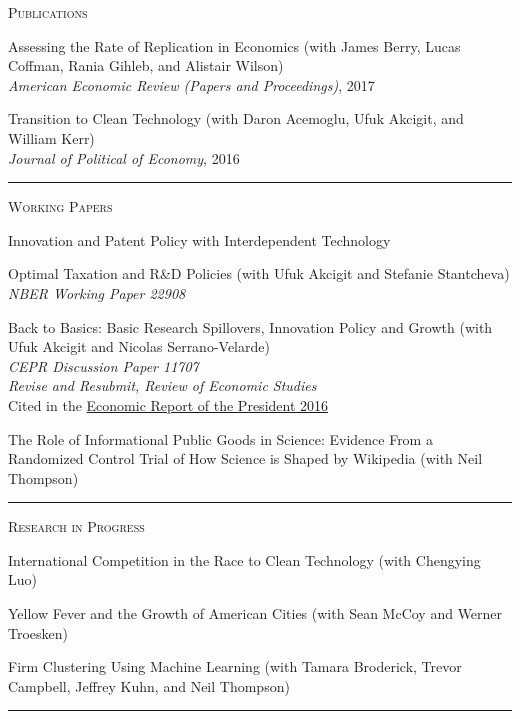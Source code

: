 \documentclass{article}
\begin{document}
\parbox{\textwidth}{
\parbox[t]{0.28\textwidth}{ \raggedright \noindent \textsc{ Publications } }
\parbox[t]{0.72\textwidth}{ \raggedright

Assessing the Rate of Replication in Economics (with James Berry, Lucas Coffman, Rania Gihleb, and Alistair Wilson) \\
\textit{American Economic Review (Papers and Proceedings)}, 2017
\vspace{0.27cm}

Transition to Clean Technology (with Daron Acemoglu, Ufuk Akcigit, and William Kerr) \\
\textit{Journal of Political of Economy}, 2016
\vspace{0.27cm}

}
\textcolor{light-gray}{\hrule}
}
\vspace{0.3cm}

\parbox{\textwidth}{
\parbox[t]{0.28\textwidth}{ \raggedright \noindent \textsc{ Working Papers } }
\parbox[t]{0.72\textwidth}{ \raggedright

Innovation and Patent Policy with Interdependent Technology
\vspace{0.27cm}

Optimal Taxation and R\&D Policies (with Ufuk Akcigit and Stefanie Stantcheva)  \\
 \textit{NBER Working Paper 22908}
\vspace{0.27cm}

Back to Basics: Basic Research Spillovers, Innovation Policy and Growth (with Ufuk Akcigit and Nicolas Serrano-Velarde)  \\
 \textit{CEPR Discussion Paper 11707}  \\
 \textit{Revise and Resubmit, Review of Economic Studies}  \\
 Cited in the \href{https://www.gpo.gov/fdsys/pkg/ERP-2016/pdf/ERP-2016.pdf}{Economic Report of the President 2016}
\vspace{0.27cm}

The Role of Informational Public Goods in Science: Evidence From a Randomized Control Trial of How Science is Shaped by Wikipedia (with Neil Thompson)
\vspace{0.27cm}

}
\textcolor{light-gray}{\hrule}
}
\vspace{0.3cm}

\parbox{\textwidth}{
\parbox[t]{0.28\textwidth}{ \raggedright \noindent \textsc{ Research in Progress } }
\parbox[t]{0.72\textwidth}{ \raggedright

International Competition in the Race to Clean Technology (with Chengying Luo)
\vspace{0.27cm}

Yellow Fever and the Growth of American Cities (with Sean McCoy and Werner Troesken)
\vspace{0.27cm}

Firm Clustering Using Machine Learning (with Tamara Broderick, Trevor Campbell, Jeffrey Kuhn, and Neil Thompson)
\vspace{0.27cm}

}
\textcolor{light-gray}{\hrule}
}
\vspace{0.3cm}
\end{document}
